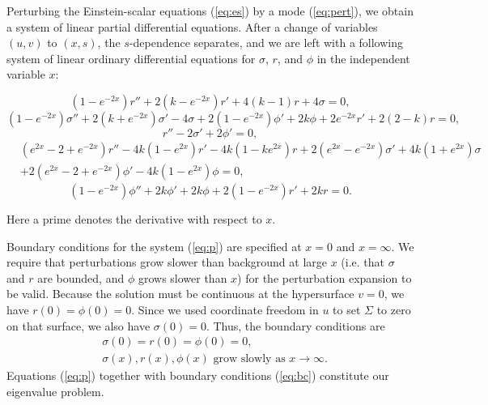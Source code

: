Perturbing the Einstein-scalar equations (\ref{eq:es}) by a mode
(\ref{eq:pert}), we obtain a system of linear partial differential
equations. After a change of variables $(u,v)$ to $(x,s)$, the
$s$-dependence separates, and we are left with a following system of
linear ordinary differential equations for $\sigma$, $r$, and $\phi$ in
the independent variable $x$:
\widetext
\begin{mathletters} \label{eq:p}
\begin{equation} \label{eq:p:3}
  (1 - e^{-2x}) r'' + 2 (k - e^{-2x}) r' + 4 (k - 1) r + 4 \sigma = 0,
\end{equation}
\begin{equation} \label{eq:p:4}
  (1 - e^{-2x}) \sigma'' + 2 (k + e^{-2x}) \sigma' - 4 \sigma
  + 2 (1 - e^{-2x}) \phi' + 2k \phi
  + 2 e^{-2x} r' + 2 (2-k) r = 0,
\end{equation}
\begin{equation} \label{eq:p:5}
  r'' - 2 \sigma' + 2 \phi' = 0,
\end{equation}
\begin{eqnarray} \label{eq:p:6}
  &(e^{2x} - 2 + e^{-2x}) r'' - 4k (1 - e^{2x}) r' - 4k (1 - k e^{2x}) r
  + 2 (e^{2x} - e^{-2x}) \sigma' + 4k (1 + e^{2x}) \sigma \nonumber\\
  &+ 2 (e^{2x} - 2 + e^{-2x}) \phi' - 4k (1 - e^{2x}) \phi = 0,
\end{eqnarray}
\begin{equation} \label{eq:p:7}
  (1 - e^{-2x}) \phi'' + 2k \phi' + 2k \phi + 2 (1 - e^{-2x}) r' + 2k r = 0.
\end{equation}
\end{mathletters}
\narrowtext
Here a prime denotes the derivative with respect to $x$.

Boundary conditions for the system (\ref{eq:p}) are specified at $x=0$
and $x=\infty$. We require that perturbations grow slower than
background at large $x$ (i.e. that $\sigma$ and $r$ are bounded, and
$\phi$ grows slower than $x$) for the perturbation expansion to be
valid. Because the solution must be continuous at the hypersurface
$v=0$, we have $r(0)=\phi(0)=0$. Since we used coordinate freedom in
$u$ to set $\Sigma$ to zero on that surface, we also have
$\sigma(0)=0$. Thus, the boundary conditions are
\begin{eqnarray} \label{eq:bc}
  &\sigma(0) = r(0) = \phi(0) = 0, \nonumber\\
  &\sigma(x), r(x), \phi(x) \text{ grow slowly as } x \rightarrow \infty.
\end{eqnarray}
Equations (\ref{eq:p}) together with boundary conditions (\ref{eq:bc})
constitute our eigenvalue problem.

